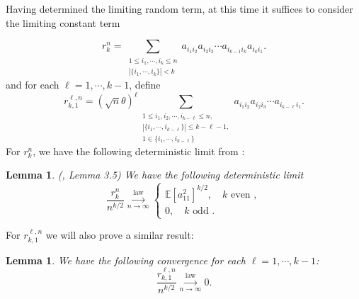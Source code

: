 \documentclass[12pt, reqno]{amsart}
\newtheorem{lemma}[theorem]{Lemma}
\theoremstyle{definition}
\theoremstyle{remark}
\numberwithin{equation}{section}
\begin{document}
Having determined the limiting random term, at this time it suffices to consider the limiting constant term

$$
r_k^n=\sum_{\substack{1\leq i_1,\cdots,i_k\leq n\\ |\{i_1,\cdots,i_k\}|<k}}a_{i_1i_2}a_{i_2i_3}\cdots a_{i_{k-1}i_k}a_{i_ki_1}.
$$
and for each $\ell=1,\cdots,k-1$, define
$$
r_{k,1}^{\ell,n}=(\sqrt{n}\theta)^\ell  \sum_{\substack{1\leq i_1,i_2,\cdots, i_{k-\ell}\leq n,\\|\{i_1,\cdots,i_{k-\ell}\}|\leq k-\ell-1,\\1\in \{i_1,\cdots,i_{k-\ell}\}}}a_{i_1i_2}a_{i_2i_3}\cdots a_{i_{k-\ell}i_1}.
$$
For $r_k^n$, we have the following deterministic limit
from \cite{bordenave2021convergence}: 
\begin{lemma}\label{curious}(\cite{bordenave2021convergence}, Lemma 3.5) We have the following deterministic limit
$$ \frac{r_k^n}{n^{k/2}}\overset{\text{law}}{\underset{n\to\infty}\longrightarrow}     \begin{cases}
    \mathbb{E}[a_{11}^2]^{k/2},\quad  k \text{ even },
    \\ 0, \quad k \text{ odd }.
    \end{cases}$$
\end{lemma}


For $r_{k,1}^{\ell,n}$ we will also prove a similar result:
\begin{lemma}\label{lemma2.6!} We have the following convergence for each $\ell=1,\cdots,k-1$:
    $$ \frac{r_{k,1}^{\ell,n}}{n^{k/2}}\overset{\text{law}}{\underset{n\to\infty}\longrightarrow}    0.$$
\end{lemma}
\end{document}
